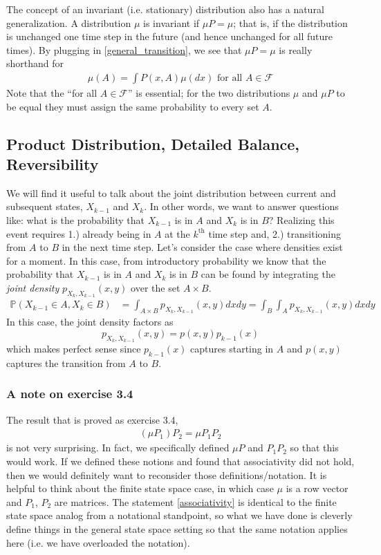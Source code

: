 \documentclass[12pt]{article}
\newcommand{\Prob}{\mathbb{P}}
\begin{document}
The concept of an invariant (i.e. stationary) distribution also has a natural generalization. A 
distribution $\mu$ is invariant if $\mu P = \mu$; that is, if the distribution is unchanged one time step in the future (and hence unchanged for all future times). By plugging in 
\ref{general_transition}, we see that $\mu P = \mu$ is really shorthand for 
\begin{align*}
\mu(A) = \int P(x, A) \mu(dx) \text{ for all } A \in \mathcal{F}
\end{align*}
Note that the ``for all $A \in \mathcal{F}$'' is essential; for the two distributions $\mu$ and $\mu P$ to be equal they must assign the same probability to every set $A$. 

\subsection{Product Distribution, Detailed Balance, Reversibility}
We will find it useful to talk about the joint distribution between current and subsequent states, $X_{k-1}$ and $X_k$. In other words, we want to answer questions like: 
what is the probability that $X_{k -1}$ is in $A$ and $X_k$ is in $B$? Realizing this event requires 1.) already being in $A$ at the $k^{\text{th}}$ time step and, 2.) transitioning 
from $A$ to $B$ in the next time step. Let's consider the case where densities exist for a moment. In this case, from introductory probability we know that 
the probability that $X_{k-1}$ is in $A$ and $X_k$ is in $B$ can be found by integrating the \textit{joint density} $p_{X_k, X_{k-1}}(x, y)$ over the set $A \times B$. 
\begin{align*}
\Prob(X_{k-1} \in A, X_k \in B) &= \int_{A \times B} p_{X_k, X_{k-1}}(x, y) dx dy =  \int_B \int _A p_{X_k, X_{k-1}}(x, y) dx dy 
\end{align*}
In this case, the joint density factors as 
\[p_{X_k, X_{k-1}}(x, y) = p(x, y)p_{k-1}(x)\]
which makes perfect sense since $p_{k-1}(x)$ captures starting in $A$ and $p(x, y)$ captures the transition from $A$ to $B$. 

\subsubsection{A note on exercise 3.4}
The result that is proved as exercise 3.4,
\begin{align}
(\mu P_1)P_2 = \mu P_1 P_2 \label{associativity}
\end{align}
is not very surprising. In fact, we specifically defined $\mu P$ and $P_1 P_2$ so that this would work. If we defined these notions and found that associativity did not hold, then 
we would definitely want to reconsider those definitions/notation. It is helpful to think about the finite state space case, in which case $\mu$ is a row vector and $P_1$, $P_2$ are 
matrices. The statement \ref{associativity} is identical to the finite state space analog from a notational standpoint, so what we have done is cleverly define things in the general state 
space setting so that the same notation applies here (i.e. we have overloaded the notation). 
\end{document}
